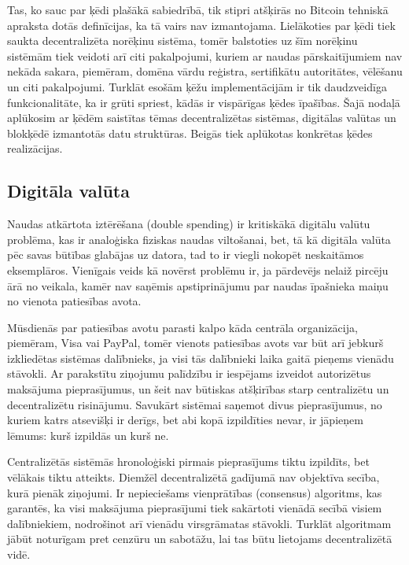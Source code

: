 Tas, ko sauc par ķēdi plašākā sabiedrībā, tik stipri atšķirās no Bitcoin tehniskā apraksta\cite{nakamoto08} dotās definīcijas, ka tā vairs nav izmantojama. 
Lielākoties par ķēdi tiek saukta decentralizēta norēķinu sistēma, tomēr balstoties uz šīm norēķinu sistēmām tiek veidoti arī citi pakalpojumi, kuriem ar naudas pārskaitījumiem nav nekāda sakara, piemēram, domēna vārdu reģistra, sertifikātu autoritātes, vēlēšanu un citi pakalpojumi.\cite{namecoin}
Turklāt esošām ķēžu implementācijām ir tik daudzveidīga funkcionalitāte, ka ir grūti spriest, kādās ir vispārīgas ķēdes īpašības.
Šajā nodaļā aplūkosim ar ķēdēm saistītas tēmas \textemdash{} decentralizētas sistēmas, digitālas valūtas un blokķēdē izmantotās datu struktūras. Beigās tiek aplūkotas konkrētas ķēdes realizācijas.

\subsection{Digitāla valūta}
Naudas atkārtota iztērēšana (double spending) ir kritiskākā digitālu valūtu problēma, kas ir analoģiska fiziskas naudas viltošanai, bet, tā kā digitāla valūta pēc savas būtības glabājas uz datora, tad to ir viegli nokopēt neskaitāmos eksemplāros. Vienīgais veids kā novērst problēmu ir, ja pārdevējs nelaiž pircēju ārā no veikala, kamēr nav saņēmis apstiprinājumu par naudas īpašnieka maiņu no vienota patiesības avota.\cite{frankel96}

Mūsdienās par patiesības avotu parasti kalpo kāda centrāla organizācija, piemēram, Visa vai PayPal, tomēr vienots patiesības avots var būt arī jebkurš izkliedētas sistēmas dalībnieks, ja visi tās dalībnieki laika gaitā pieņems vienādu stāvokli.
Ar parakstītu ziņojumu palīdzību ir iespējams izveidot autorizētus maksājuma pieprasījumus, un šeit nav būtiskas atšķirības starp centralizētu un decentralizētu risinājumu. Savukārt sistēmai saņemot divus pieprasījumus, no kuriem katrs atsevišķi ir derīgs, bet abi kopā izpildīties nevar, ir jāpieņem lēmums: kurš izpildās un kurš ne.

Centralizētās sistēmās hronoloģiski pirmais pieprasījums tiktu izpildīts, bet vēlākais tiktu atteikts. Diemžēl decentralizētā gadījumā nav objektīva secība, kurā pienāk ziņojumi. Ir nepieciešams vienprātības (consensus) algoritms, kas garantēs, ka visi maksājuma pieprasījumi tiek sakārtoti vienādā secībā visiem dalībniekiem, nodrošinot arī vienādu virsgrāmatas stāvokli.
Turklāt algoritmam jābūt noturīgam pret cenzūru un sabotāžu, lai tas būtu lietojams decentralizētā vidē.

